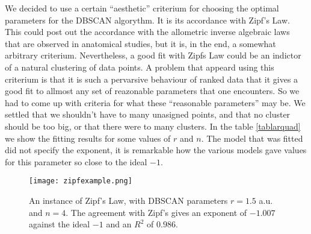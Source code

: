 \documentclass{article}
\begin{document}
We decided to use a certain ``aesthetic'' criterium for choosing the optimal parameters
for the DBSCAN algorythm.  It is its accordance with Zipf's Law.  This could post out
the accordance with the allometric inverse algebraic laws that are observed in
anatomical studies, but it is, in the end, a somewhat arbitrary criterium.
Nevertheless, a good
fit with Zipfs Law could be an indictor of a natural clustering of data points.
A problem that appeard using this criterium is that it is such a pervarsive
behaviour of ranked data
that it gives a good fit to allmost any set of reazonable parameters
that one encounters. So we had to come up with criteria for what these ``reasonable
parameters'' may be.  We settled that we shouldn't have to many unasigned points, and
that no cluster should be too big, or that there were to many clusters. In the
table \ref{tablarquad} we show the fitting results for some values of
$r$ and $n$. The model that was fitted did not specify the exponent, it
is remarkable how the various models gave values for this parameter so close
to the ideal $-1$. 


\begin{figure}
  \centering
  \texttt{[image: zipfexample.png]}
  \caption{An instance of Zipf's Law, with DBSCAN parameters
    $r=1.5$ a.u. and $n=4$. The agreement with Zipf's
    gives an exponent of $-1.007$ against the ideal $-1$ and
    an $R^2$ of $0.986$.}
\end{figure}
\end{document}
